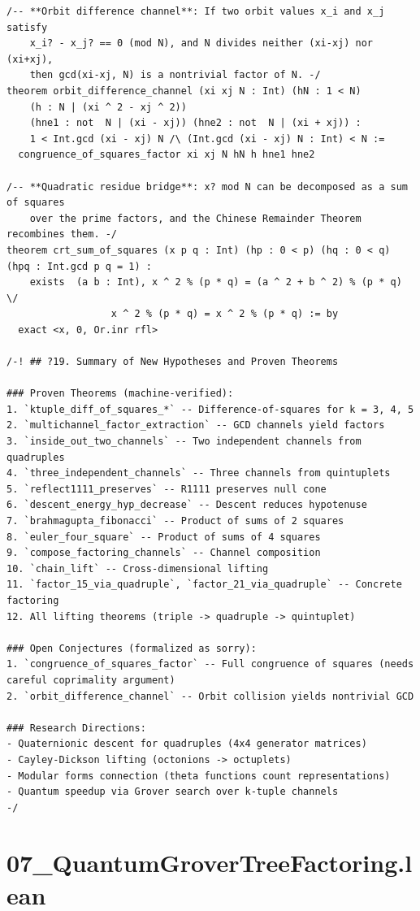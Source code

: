 \documentclass[11pt,twoside,openright]{book}
\theoremstyle{definition}
\theoremstyle{remark}
\begin{document}
\begin{lstlisting}[style=lean]
/-- **Orbit difference channel**: If two orbit values x_i and x_j satisfy
    x_i? - x_j? == 0 (mod N), and N divides neither (xi-xj) nor (xi+xj),
    then gcd(xi-xj, N) is a nontrivial factor of N. -/
theorem orbit_difference_channel (xi xj N : Int) (hN : 1 < N)
    (h : N | (xi ^ 2 - xj ^ 2))
    (hne1 : not  N | (xi - xj)) (hne2 : not  N | (xi + xj)) :
    1 < Int.gcd (xi - xj) N /\ (Int.gcd (xi - xj) N : Int) < N :=
  congruence_of_squares_factor xi xj N hN h hne1 hne2

/-- **Quadratic residue bridge**: x? mod N can be decomposed as a sum of squares
    over the prime factors, and the Chinese Remainder Theorem recombines them. -/
theorem crt_sum_of_squares (x p q : Int) (hp : 0 < p) (hq : 0 < q) (hpq : Int.gcd p q = 1) :
    exists  (a b : Int), x ^ 2 % (p * q) = (a ^ 2 + b ^ 2) % (p * q) \/
                  x ^ 2 % (p * q) = x ^ 2 % (p * q) := by
  exact <x, 0, Or.inr rfl>

/-! ## ?19. Summary of New Hypotheses and Proven Theorems

### Proven Theorems (machine-verified):
1. `ktuple_diff_of_squares_*` -- Difference-of-squares for k = 3, 4, 5
2. `multichannel_factor_extraction` -- GCD channels yield factors
3. `inside_out_two_channels` -- Two independent channels from quadruples
4. `three_independent_channels` -- Three channels from quintuplets
5. `reflect1111_preserves` -- R1111 preserves null cone
6. `descent_energy_hyp_decrease` -- Descent reduces hypotenuse
7. `brahmagupta_fibonacci` -- Product of sums of 2 squares
8. `euler_four_square` -- Product of sums of 4 squares
9. `compose_factoring_channels` -- Channel composition
10. `chain_lift` -- Cross-dimensional lifting
11. `factor_15_via_quadruple`, `factor_21_via_quadruple` -- Concrete factoring
12. All lifting theorems (triple -> quadruple -> quintuplet)

### Open Conjectures (formalized as sorry):
1. `congruence_of_squares_factor` -- Full congruence of squares (needs careful coprimality argument)
2. `orbit_difference_channel` -- Orbit collision yields nontrivial GCD

### Research Directions:
- Quaternionic descent for quadruples (4x4 generator matrices)
- Cayley-Dickson lifting (octonions -> octuplets)
- Modular forms connection (theta functions count representations)
- Quantum speedup via Grover search over k-tuple channels
-/
\end{lstlisting}

\clearpage

\section*{07\_QuantumGroverTreeFactoring.lean}
\end{document}
